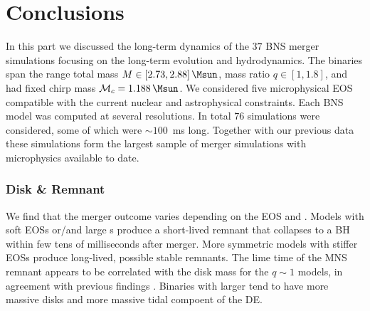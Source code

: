 
\chapter{Conclusions} %



In this part we discussed the long-term dynamics of the $37$ \ac{BNS} merger simulations
focusing on the long-term evolution and hydrodynamics. 
The binaries span the range total mass $M\in[2.73, 2.88]\,\Msun$, 
mass ratio $q\in[1,1.8]$, and had fixed chirp mass $\mathcal{M}_c=1.188\,\Msun$.
We considered five microphysical \ac{EOS} compatible with the current nuclear and
astrophysical constraints. 
Each \ac{BNS} model was computed at several resolutions. 
In total $76$ simulations were considered, some of which were ${\sim}100$~ms 
long. Together with our previous data
\citep{Bernuzzi:2015opx,Radice:2016dwd,Radice:2016rys,Radice:2017lry,Radice:2018xqa,Radice:2018pdn,Perego:2019adq,Endrizzi:2019trv,Bernuzzi:2020txg}
these simulations form the largest sample of merger simulations with microphysics
available to date. 

\subsection{Disk \& Remnant}

We find that the merger outcome varies depending on the \ac{EOS} and \mr{}.
Models with soft \acp{EOS} or/and large \mr{}s produce a short-lived remnant that 
collapses to a \ac{BH} within few tens of milliseconds after merger. 
More symmetric models with stiffer \acp{EOS} produce long-lived, possible 
stable remnants. The lime time of the \ac{MNS} remnant appears to be correlated with the 
disk mass for the $q{\sim}1$ models, in agreement with previous findings 
\citep{Radice:2017lry,Radice:2018pdn}.
Binaries with larger \mr{} tend to have more massive disks and more massive tidal 
compoent of the \ac{DE}.

